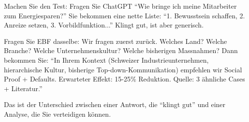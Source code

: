 \begin{tcolorbox}[colback=yellow!5!white, colframe=yellow!75!black,
    title=P1-$\mathcal{P}$-M: Mittel (Praxis)]

Machen Sie den Test: Fragen Sie ChatGPT ``Wie bringe ich meine Mitarbeiter zum Energiesparen?'' Sie bekommen eine nette Liste: ``1. Bewusstsein schaffen, 2. Anreize setzen, 3. Vorbildfunktion...'' Klingt gut, ist aber generisch.

Fragen Sie EBF dasselbe: Wir fragen zuerst zurück. Welches Land? Welche Branche? Welche Unternehmenskultur? Welche bisherigen Massnahmen? Dann bekommen Sie: ``In Ihrem Kontext (Schweizer Industrieunternehmen, hierarchische Kultur, bisherige Top-down-Kommunikation) empfehlen wir Social Proof + Defaults. Erwarteter Effekt: 15-25\% Reduktion. Quelle: 3 ähnliche Cases + Literatur.''

Das ist der Unterschied zwischen einer Antwort, die ``klingt gut'' und einer Analyse, die Sie verteidigen können.

\end{tcolorbox}

